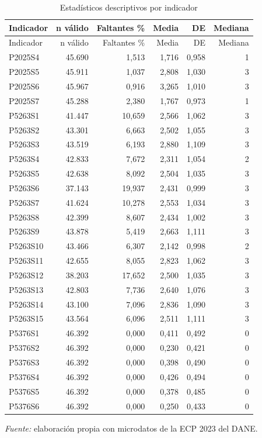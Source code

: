 
\begin{longtable}[t]{lrrrrr}
\caption{Estadísticos descriptivos por indicador}\\
\toprule
Indicador & n válido & Faltantes \% & Media & DE & Mediana\\
\midrule
\endfirsthead
\toprule
Indicador & n válido & Faltantes \% & Media & DE & Mediana\\
\midrule
\endhead
P2025S4 & 45.690 & 1,513 & 1,716 & 0,958 & 1\\
P2025S5 & 45.911 & 1,037 & 2,808 & 1,030 & 3\\
P2025S6 & 45.967 & 0,916 & 3,265 & 1,010 & 3\\
P2025S7 & 45.288 & 2,380 & 1,767 & 0,973 & 1\\
P5263S1 & 41.447 & 10,659 & 2,566 & 1,062 & 3\\
\addlinespace
P5263S2 & 43.301 & 6,663 & 2,502 & 1,055 & 3\\
P5263S3 & 43.519 & 6,193 & 2,880 & 1,109 & 3\\
P5263S4 & 42.833 & 7,672 & 2,311 & 1,054 & 2\\
P5263S5 & 42.638 & 8,092 & 2,504 & 1,035 & 3\\
P5263S6 & 37.143 & 19,937 & 2,431 & 0,999 & 3\\
\addlinespace
P5263S7 & 41.624 & 10,278 & 2,553 & 1,034 & 3\\
P5263S8 & 42.399 & 8,607 & 2,434 & 1,002 & 3\\
P5263S9 & 43.878 & 5,419 & 2,663 & 1,111 & 3\\
P5263S10 & 43.466 & 6,307 & 2,142 & 0,998 & 2\\
P5263S11 & 42.655 & 8,055 & 2,823 & 1,062 & 3\\
\addlinespace
P5263S12 & 38.203 & 17,652 & 2,500 & 1,035 & 3\\
P5263S13 & 42.803 & 7,736 & 2,640 & 1,076 & 3\\
P5263S14 & 43.100 & 7,096 & 2,836 & 1,090 & 3\\
P5263S15 & 43.564 & 6,096 & 2,511 & 1,111 & 3\\
P5376S1 & 46.392 & 0,000 & 0,411 & 0,492 & 0\\
\addlinespace
P5376S2 & 46.392 & 0,000 & 0,230 & 0,421 & 0\\
P5376S3 & 46.392 & 0,000 & 0,398 & 0,490 & 0\\
P5376S4 & 46.392 & 0,000 & 0,426 & 0,494 & 0\\
P5376S5 & 46.392 & 0,000 & 0,378 & 0,485 & 0\\
P5376S6 & 46.392 & 0,000 & 0,250 & 0,433 & 0\\
\bottomrule
\end{longtable}
\par\smallskip\noindent\parbox{\linewidth}{\footnotesize\textit{Fuente:} elaboración propia con microdatos de la ECP 2023 del DANE.}
